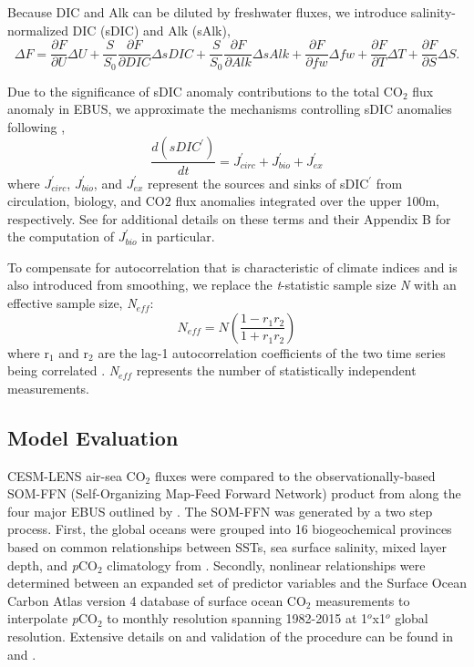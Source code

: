 \documentclass[hvmath, online,bgd]{copernicus_discussions}
\begin{document}
Because DIC and Alk can be diluted by freshwater fluxes, we introduce salinity-normalized DIC (sDIC) and Alk (sAlk), 
\begin{equation}
	\Delta F = \frac{\partial F}{\partial U}\Delta U + \frac{S}{S_{0}}\frac{\partial F}{\partial DIC}\Delta sDIC + \frac{S}{S_{0}}\frac{\partial F}{\partial Alk}\Delta sAlk + 	\frac{\partial F}{\partial fw}\Delta fw + \frac{\partial F}{\partial T}\Delta T + \frac{\partial F}{\partial S}\Delta S .
\end{equation}

Due to the significance of sDIC anomaly contributions to the total CO$_{2}$ flux anomaly in EBUS, we approximate the mechanisms controlling sDIC anomalies following \cite{Lovenduski:2007},
\begin{equation}
	\frac{d(sDIC^{\prime})}{dt} = J^{\prime}_{circ}+ J^{\prime}_{bio} + J^{\prime}_{ex}
\end{equation}
where $J^{\prime}_{circ}$, $J^{\prime}_{bio}$, and $J^{\prime}_{ex}$ represent the sources and sinks of sDIC$^{\prime}$ from circulation, biology, and CO${2}$ flux anomalies integrated over the upper 100m, respectively. See \citet[][their Equation 4]{Lovenduski:2007} for additional details on these terms and their Appendix B for the computation of $J^{\prime}_{bio}$ in particular. 

To compensate for autocorrelation that is characteristic of climate indices and is also introduced from smoothing, we replace the \textit{t}-statistic sample size \textit{N} with an effective sample size, \textit{N$_{eff}$}:
\begin{equation}
	N_{eff} = N\left(\frac{1 - r_{1}r_{2}}{1 + r_{1}r_{2}}\right)
\end{equation}
where r$_{1}$ and r$_{2}$ are the lag-1 autocorrelation coefficients of the two time series being correlated \citep{Bretherton:1999, Lovenduski:2005}. \textit{N}$_{eff}$ represents the number of statistically independent measurements.

\subsection{Model Evaluation}
CESM-LENS air-sea CO$_{2}$ fluxes were compared to the observationally-based SOM-FFN (Self-Organizing Map-Feed Forward Network) product  from \citet{Landschuetzer:2017} along the four major EBUS outlined by \citet{Chavez:2009}. The SOM-FFN was generated by a two step process. First, the global oceans were grouped into 16 biogeochemical provinces based on common relationships between SSTs, sea surface salinity, mixed layer depth, and \textit{p}CO$_{2}$ climatology from \citet{Takahashi:2009}. Secondly, nonlinear relationships were determined between an expanded set of predictor variables and the Surface Ocean Carbon Atlas version 4 \citep{Bakker:2016} database of surface ocean CO$_{2}$ measurements to interpolate \textit{p}CO$_{2}$ to monthly resolution spanning 1982-2015 at 1$^{o}$x1$^{o}$ global resolution. Extensive details on and validation of the procedure can be found in \citet{Landschuetzer:2013} and \citet{Landschuetzer:2016}.
\end{document}
